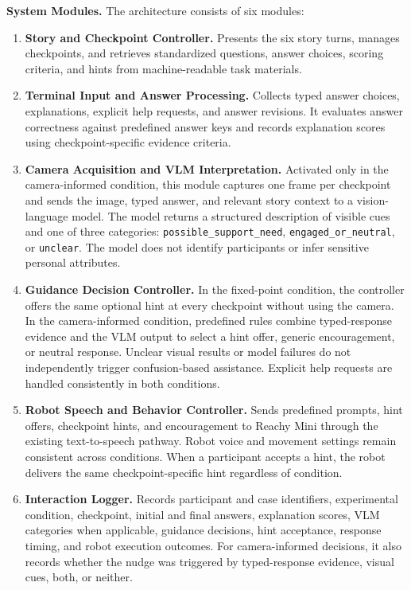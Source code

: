 \documentclass[conference]{IEEEtran}
\begin{document}
\noindent\textbf{System Modules.}
The architecture consists of six modules:

\begin{enumerate}
    \item \textbf{Story and Checkpoint Controller.}
    Presents the six story turns, manages checkpoints, and retrieves standardized questions, answer choices, scoring criteria, and hints from machine-readable task materials.

    \item \textbf{Terminal Input and Answer Processing.}
    Collects typed answer choices, explanations, explicit help requests, and answer revisions. It evaluates answer correctness against predefined answer keys and records explanation scores using checkpoint-specific evidence criteria.

    \item \textbf{Camera Acquisition and VLM Interpretation.}
    Activated only in the camera-informed condition, this module captures one frame per checkpoint and sends the image, typed answer, and relevant story context to a vision-language model. The model returns a structured description of visible cues and one of three categories: \texttt{possible\_support\_need}, \texttt{engaged\_or\_neutral}, or \texttt{unclear}. The model does not identify participants or infer sensitive personal attributes.

    \item \textbf{Guidance Decision Controller.}
    In the fixed-point condition, the controller offers the same optional hint at every checkpoint without using the camera. In the camera-informed condition, predefined rules combine typed-response evidence and the VLM output to select a hint offer, generic encouragement, or neutral response. Unclear visual results or model failures do not independently trigger confusion-based assistance. Explicit help requests are handled consistently in both conditions.

    \item \textbf{Robot Speech and Behavior Controller.}
    Sends predefined prompts, hint offers, checkpoint hints, and encouragement to Reachy Mini through the existing text-to-speech pathway. Robot voice and movement settings remain consistent across conditions. When a participant accepts a hint, the robot delivers the same checkpoint-specific hint regardless of condition.

    \item \textbf{Interaction Logger.}
    Records participant and case identifiers, experimental condition, checkpoint, initial and final answers, explanation scores, VLM categories when applicable, guidance decisions, hint acceptance, response timing, and robot execution outcomes. For camera-informed decisions, it also records whether the nudge was triggered by typed-response evidence, visual cues, both, or neither.
\end{enumerate}
\end{document}
